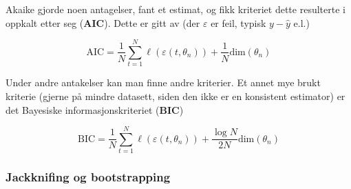Akaike gjorde noen antagelser, fant et estimat, og fikk kriteriet dette resulterte i oppkalt etter seg (\textbf{AIC}). Dette er gitt av (der $\varepsilon$ er feil, typisk $y - \hat{y}$ e.l.)

\begin{equation}
	\textrm{AIC} = \frac{1}{N} \sum_{t = 1}^N \ell (\varepsilon (t, \theta_n)) + \frac{1}{N} \textrm{dim}(\theta_n)
\end{equation}

Under andre antakelser kan man finne andre kriterier. Et annet mye brukt kriterie (gjerne på mindre datasett, siden den ikke er en konsistent estimator) er det Bayesiske informasjonskriteriet (\textbf{BIC})

\begin{equation}
	\textrm{BIC} = \frac{1}{N} \sum_{t = 1}^N \ell (\varepsilon (t, \theta_n)) + \frac{\log N}{2N} \textrm{dim}(\theta_n)
\end{equation}

\subsubsection{Jackknifing og bootstrapping}


